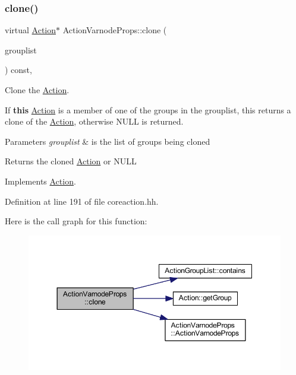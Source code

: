 \subsubsection{\texorpdfstring{clone()}{clone()}}
{\footnotesize\ttfamily virtual \mbox{\hyperlink{class_action}{Action}}$\ast$ Action\+Varnode\+Props\+::clone (\begin{DoxyParamCaption}\item[{const \mbox{\hyperlink{class_action_group_list}{Action\+Group\+List}} \&}]{grouplist }\end{DoxyParamCaption}) const\hspace{0.3cm}{\ttfamily [inline]}, {\ttfamily [virtual]}}



Clone the \mbox{\hyperlink{class_action}{Action}}. 

If {\bfseries{this}} \mbox{\hyperlink{class_action}{Action}} is a member of one of the groups in the grouplist, this returns a clone of the \mbox{\hyperlink{class_action}{Action}}, otherwise N\+U\+LL is returned. 
\begin{DoxyParams}{Parameters}
{\em grouplist} & is the list of groups being cloned \\
\hline
\end{DoxyParams}
\begin{DoxyReturn}{Returns}
the cloned \mbox{\hyperlink{class_action}{Action}} or N\+U\+LL 
\end{DoxyReturn}


Implements \mbox{\hyperlink{class_action_af8242e41d09e5df52f97df9e65cc626f}{Action}}.



Definition at line 191 of file coreaction.\+hh.

Here is the call graph for this function\+:
\nopagebreak
\begin{figure}[H]
\begin{center}
\leavevmode
\includegraphics[width=350pt]{class_action_varnode_props_a5703787530b66de1bea8f6b33091d68f_cgraph}
\end{center}
\end{figure}


